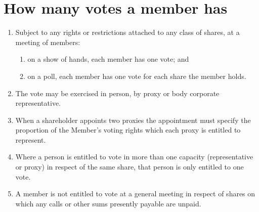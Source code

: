 \section{How many votes a member has}

\begin{enumerate}[label=(\alph*)]
    \item Subject to any rights or restrictions attached to any class of shares, at a meeting of members:
    \begin{enumerate}[label=(\roman*)]
        \item on a show of hands, each member has one vote; and
        \item on a poll, each member has one vote for each share the member holds.
    \end{enumerate}
    
    \item The vote may be exercised in person, by proxy or body corporate representative.
    
    \item When a shareholder appoints two proxies the appointment must specify the proportion of the Member's voting rights which each proxy is entitled to represent.
    
    \item Where a person is entitled to vote in more than one capacity (representative or proxy) in respect of the same share, that person is only entitled to one vote.
    
    \item A member is not entitled to vote at a general meeting in respect of shares on which any calls or other sums presently payable are unpaid.
\end{enumerate} 